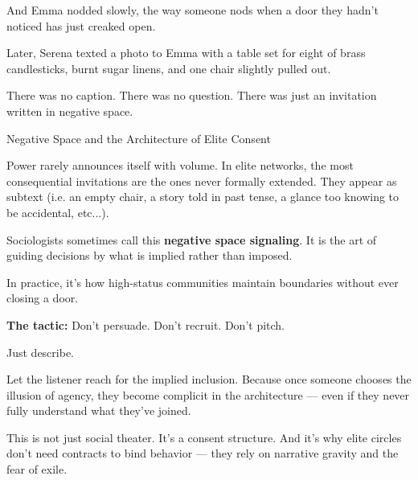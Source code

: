 And Emma nodded slowly, the way someone nods when a door they hadn’t noticed has just creaked open.

Later, Serena texted a photo to Emma with a table set for eight of 
brass candlesticks, burnt sugar linens, and one chair slightly pulled out.

There was no caption.  
There was no question.  
There was just an invitation written in negative space.

\medskip

\begin{PsychologicalSidebar}{Negative Space and the Architecture of Elite Consent}

Power rarely announces itself with volume.  
In elite networks, the most consequential invitations are the ones never formally extended.  
They appear as subtext (i.e. an empty chair, a story told in past tense, a glance too knowing 
to be accidental, etc...).

\medskip

Sociologists sometimes call this \textbf{negative space signaling}. It is the art of guiding 
decisions by what is implied rather than imposed.  

\medskip

In practice, it's how high-status communities maintain boundaries without ever closing a door.  

\medskip

\textbf{The tactic:}  Don’t persuade. Don’t recruit. Don’t pitch.

\medskip

Just describe.

\medskip

Let the listener reach for the implied inclusion.  
Because once someone chooses the illusion of agency, they become complicit in the architecture — even if 
they never fully understand what they’ve joined.

\medskip

This is not just social theater.  
It’s a consent structure.  
And it’s why elite circles don’t need contracts to bind behavior — they rely on narrative gravity and the fear of exile.

\end{PsychologicalSidebar}

\medskip

